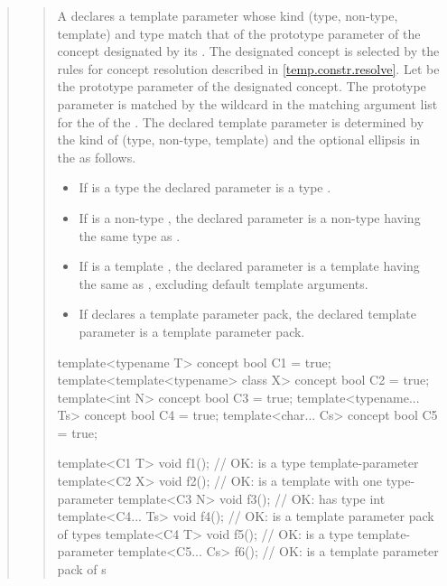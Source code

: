 \begin{quote}
\begin{quote}
\setcounter{Paras}{8}
\pnum
A  declares a template parameter whose 
kind (type, non-type, template) and type match that of the prototype parameter 
of the concept designated by its .
% 
The designated concept is selected by the rules for concept resolution 
described in \ref{temp.constr.resolve}.
% 
Let  be the prototype parameter of the designated concept.
\enternote
The prototype parameter is matched by the wildcard in the matching argument 
list for the  of 
the .
\exitnote
% 
The declared template parameter is determined by the kind of  
(type, non-type, template) and the optional ellipsis in the
 as follows.
% 
\begin{itemize}
\item If  is a type  the declared
parameter is a type . 

\item If  is a non-type , the declared
parameter is a non-type  having the same 
type as .

\item If  is a template , the declared
parameter is a template  having the same 
 as , excluding default template 
arguments.

\item If  declares a template parameter pack, the declared 
template parameter is a template parameter pack.
\end{itemize}
% 
\enterexample
\begin{codeblock}
template<typename T> concept bool C1 = true;
template<template<typename> class X> concept bool C2 = true;
template<int N> concept bool C3 = true;
template<typename... Ts> concept bool C4 = true;
template<char... Cs> concept bool C5 = true;

template<C1 T> void f1();     // OK:  is a type template-parameter
template<C2 X> void f2();     // OK:  is a template with one type-parameter
template<C3 N> void f3();     // OK:  has type int
template<C4... Ts> void f4(); // OK:  is a template parameter pack of types
template<C4 T> void f5();     // OK:  is a type template-parameter
template<C5... Cs> f6();      // OK:  is a template parameter pack of s
\end{codeblock}
\exitexample


\end{quote}
\end{quote}
